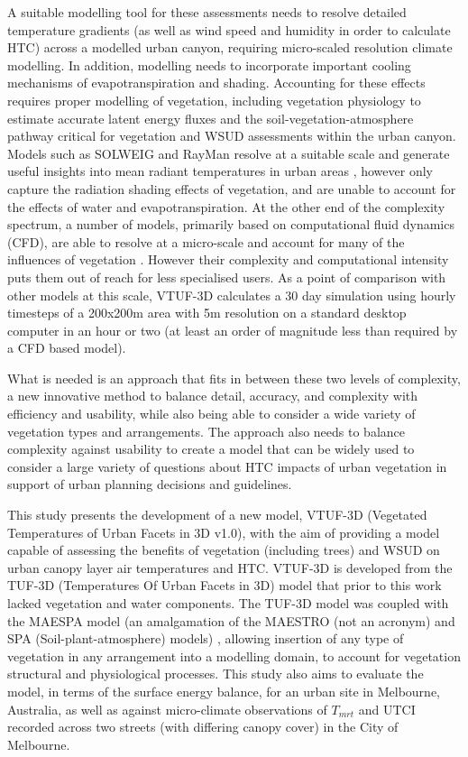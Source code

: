 \documentclass[final,3p,times,authoryear]{elsarticle}
\begin{document}
A suitable modelling tool for these assessments needs to resolve detailed temperature gradients (as well as wind speed and humidity in order to calculate HTC) across a modelled urban canyon, requiring micro-scaled resolution climate modelling. In addition, modelling needs to incorporate important cooling mechanisms of evapotranspiration and shading. Accounting for these effects requires proper modelling of vegetation, including vegetation physiology to estimate accurate latent energy fluxes and the soil-vegetation-atmosphere pathway critical for vegetation and WSUD assessments within the urban canyon. Models such as SOLWEIG \citep{Lindberg2008a} and RayMan \citep{Matzarakis2007,Matzarakis2010} resolve at a suitable scale and generate useful insights into mean radiant temperatures in urban areas \citep{Chen2014a}, however only capture the radiation shading effects of vegetation, and are unable to account for the effects of water and evapotranspiration. At the other end of the complexity spectrum, a number of models, primarily based on computational fluid dynamics (CFD), are able to resolve at a micro-scale and account for many of the influences of vegetation \citep{Bailey2014,Bailey2016,Kunz2000,Schlunzen2011a,Yamada2011,Bruse1999}. However their complexity and computational intensity puts them out of reach for less specialised users. As a point of comparison with other models at this scale, VTUF-3D calculates a 30 day simulation using hourly timesteps of a 200x200m area with 5m resolution on a standard desktop computer in an hour or two (at least an order of magnitude less than required by a CFD based model).


What is needed is an approach that fits in between these two levels of complexity, a new innovative method to balance detail, accuracy, and complexity with efficiency and usability, while also being able to consider a wide variety of vegetation types and arrangements.  The approach also needs to balance complexity against usability to create a model that can be widely used to consider a large variety of questions about HTC impacts of urban vegetation in support of urban planning decisions and guidelines. 

This study presents the development of a new model, VTUF-3D (Vegetated Temperatures of Urban Facets in 3D v1.0), with the aim of providing a model capable of assessing the benefits of vegetation (including trees) and WSUD on urban canopy layer air temperatures and HTC. VTUF-3D is developed from the TUF-3D (Temperatures Of Urban Facets in 3D) model \citep{Krayenhoff2007} that prior to this work lacked vegetation and water components. The TUF-3D model was coupled with the MAESPA model (an amalgamation of the MAESTRO (not an acronym) and SPA (Soil-plant-atmosphere) models)  \citep{Duursma2012}, allowing insertion of any type of vegetation in any arrangement into a modelling domain, to account for vegetation structural and physiological processes. This study also aims to evaluate the model, in terms of the surface energy balance, for an urban site in Melbourne, Australia, as well as against micro-climate observations of $T_{mrt}$ and UTCI recorded across two streets (with differing canopy cover) in the City of Melbourne. 
\end{document}
